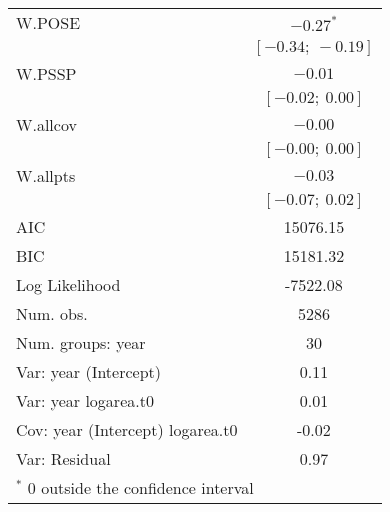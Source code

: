 \begin{table}
\begin{center}
\begin{tabular}{l c }
W.POSE                           & $-0.27^{*}$       \\
                                 & $[-0.34;\ -0.19]$ \\
W.PSSP                           & $-0.01$           \\
                                 & $[-0.02;\ 0.00]$  \\
W.allcov                         & $-0.00$           \\
                                 & $[-0.00;\ 0.00]$  \\
W.allpts                         & $-0.03$           \\
                                 & $[-0.07;\ 0.02]$  \\
\hline
AIC                              & 15076.15          \\
BIC                              & 15181.32          \\
Log Likelihood                   & -7522.08          \\
Num. obs.                        & 5286              \\
Num. groups: year                & 30                \\
Var: year (Intercept)            & 0.11              \\
Var: year logarea.t0             & 0.01              \\
Cov: year (Intercept) logarea.t0 & -0.02             \\
Var: Residual                    & 0.97              \\
\hline
\multicolumn{2}{l}{\scriptsize{$^*$ 0 outside the confidence interval}}
\end{tabular}
\label{table:POSEgrowth-byYr}
\end{center}
\end{table}


